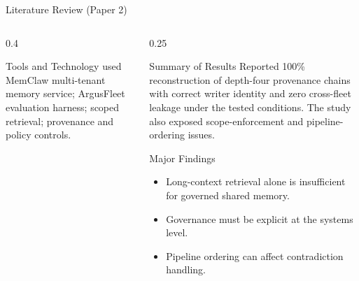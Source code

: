 \begin{frame}{Literature Review (Paper 2)}
\begin{columns}[T]
\begin{column}{0.4\textwidth}
    \begin{block}{Tools and Technology used}
      \tiny MemClaw multi-tenant memory service; ArgusFleet evaluation harness; scoped retrieval; provenance and policy controls.
    \end{block}
  \end{column}

  \begin{column}{0.25\textwidth}
    \begin{block}{Summary of Results}
      \tiny Reported 100\% reconstruction of depth-four provenance chains with correct writer identity and zero cross-fleet leakage under the tested conditions. The study also exposed scope-enforcement and pipeline-ordering issues.
    \end{block}
    \vspace{0.12cm}
    \begin{block}{Major Findings}
      \tiny
      \begin{itemize}\setlength\itemsep{1pt}
      \item Long-context retrieval alone is insufficient for governed shared memory.
\item Governance must be explicit at the systems level.
\item Pipeline ordering can affect contradiction handling.
      \end{itemize}
    \end{block}
  \end{column}
  \end{columns}
\end{frame}
